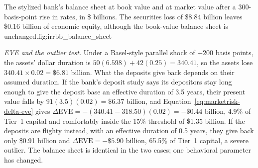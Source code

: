 \documentclass[../ai_in_finance]{subfiles}
\begin{document}
\begin{bookfigure}{The stylized bank's balance sheet at book value and at market value after a 300-basis-point rise in rates, in \$ billions. The securities loss of \$8.84 billion leaves \$0.16 billion of economic equity, although the book-value balance sheet is unchanged.}{fig:irrbb_balance_sheet}
\end{bookfigure}

\emph{EVE and the outlier test.} Under a Basel-style parallel shock of $+200$ basis points, the assets' dollar duration is $50(6.598) + 42(0.25) = 340.41$, so the assets lose $340.41 \times 0.02 = \$6.81$ billion. What the deposits give back depends on their assumed duration. If the bank's deposit study says its depositors stay long enough to give the deposit base an effective duration of 3.5 years, their present value falls by $91(3.5)(0.02) = \$6.37$ billion, and Equation~\eqref{eq:marketrisk-delta-eve} gives $\Delta\text{EVE} = -(340.41 - 318.50)(0.02) = -\$0.44$ billion, 4.9\% of Tier~1 capital and comfortably inside the 15\% threshold of \$1.35 billion. If the deposits are flighty instead, with an effective duration of 0.5 years, they give back only \$0.91 billion and $\Delta\text{EVE} = -\$5.90$ billion, 65.5\% of Tier~1 capital, a severe outlier. The balance sheet is identical in the two cases; one behavioral parameter has changed.
\end{document}

